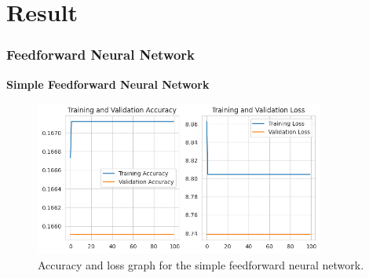 \section{Result}\label{sec:result}


\subsubsection{Feedforward Neural Network}

\textbf{Simple Feedforward Neural Network}

\begin{figure}[ht]
    \centering
    \includegraphics[width=0.85\textwidth]{./img/ffnn/simple/accuracy-loss-graph}
    \caption{Accuracy and loss graph for the simple feedforward neural network.}
    \label{fig:ffnn-simple-accuracy-loss-graph}
\end{figure}

